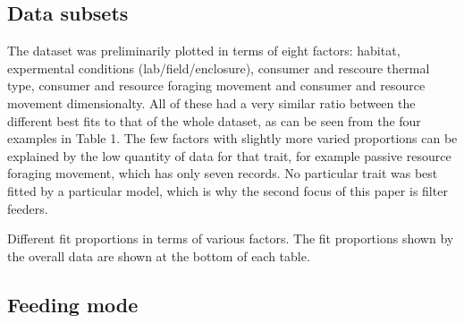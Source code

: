 \documentclass[11pt, a4paper, titlepage]{article}
\begin{document}
\subsection{Data subsets}

The dataset was preliminarily plotted in terms of eight factors: habitat, expermental conditions (lab/field/enclosure), consumer and rescoure thermal type, consumer and resource foraging movement and consumer and resource movement dimensionalty. All of these had a very similar ratio between the different best fits to that of the whole dataset, as can be seen from the four examples in Table 1. The few factors with slightly more varied proportions can be explained by the low quantity of data for that trait, for example passive resource foraging movement, which has only seven records. No particular trait was best fitted by a particular model, which is why the second focus of this paper is filter feeders. 

\begin{table}[ht!]
	\centering{}
\end{table}

\begin{table}[ht!]
	\centering{}
\end{table}

\begin{table}[ht!]
	\centering{}
\end{table}

\begin{table}[ht!]
	\centering{}
	\caption{Different fit proportions in terms of various factors. The fit proportions shown by the overall data are shown at the bottom of each table.}
\end{table}

\subsection{Feeding mode}
\end{document}
